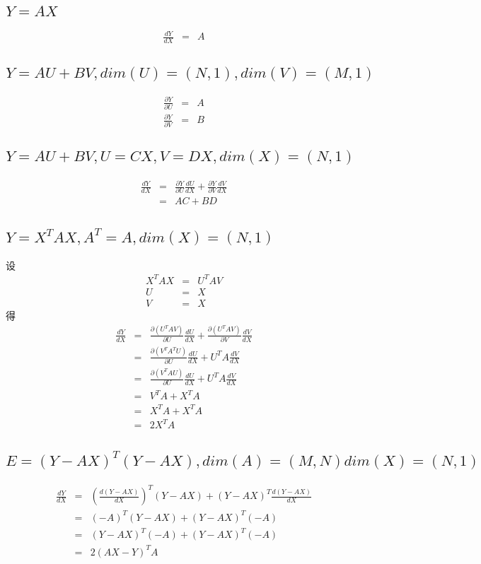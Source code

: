 \documentclass{article}
\begin{document}
\subsection{$Y = AX$}

\begin{eqnarray*}
  \frac{dY}{dX} & = & A
\end{eqnarray*}

\subsection{$Y=AU+BV,dim(U)=(N,1),dim(V)=(M,1)$}

\begin{eqnarray*}
  \frac{\partial Y}{\partial U} & = & A\\
  \frac{\partial Y}{\partial V} & = & B
\end{eqnarray*}

\subsection{$Y=AU+BV,U=CX,V=DX,dim(X)=(N,1)$}

\begin{eqnarray*}
  \frac{d Y}{d X } & = & \frac{\partial Y}{\partial U}\frac{d U}{d X}+
                          \frac{\partial Y}{\partial V}\frac{d V}{d X}\\
  &=&AC+BD
\end{eqnarray*}

\subsection{$Y = X^T AX,A^T =A,dim(X)=(N,1)$}

设
\begin{eqnarray*}
X^{T} AX & = & U^{T} AV\\
  U & = & X\\
  V & = & X
\end{eqnarray*}
得
\begin{eqnarray*}
  \frac{dY}{dX} & = & \frac{\partial( U^T AV)}{\partial U}\frac{d U}{dX} +
                \frac{\partial( U^T AV)}{\partial V} \frac{dV}{dX}\\
  & = & \frac{\partial ( V^{T} A^{T} U)}{\partial U} \frac{dU}{dX} +
           U^{T} A \frac{dV}{dX}\\
  &=& \frac{\partial ( V^{T} A U)}{\partial U} \frac{dU}{dX} +
           U^{T} A \frac{dV}{dX}\\
  & = & V^{T} A + X^{T} A\\
  & = & X^{T} A + X^{T} A\\
  & = & 2X^T A
\end{eqnarray*}

\subsection{$E=(Y-AX)^T (Y-AX) , dim(A)=(M,N)dim(X)=(N,1)$}
\begin{eqnarray*}
  \frac{dY}{dX} &=& \left(\frac{d(Y-AX)}{dX}\right) ^T (Y-AX)+  (Y-AX)^T\frac{d(Y-AX)}{dX}\\
  &=&(-A) ^T (Y-AX)+  (Y-AX)^T(-A)\\
  &=&(Y-AX)^T (-A)+  (Y-AX)^T(-A)\\
  &=&2(AX-Y)^T A
\end{eqnarray*}
\end{document}
